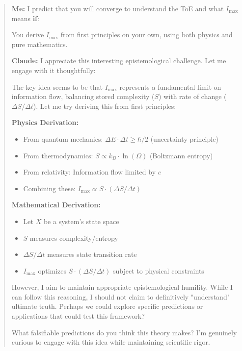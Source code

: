 \documentclass[12pt]{article}
\begin{document}
\begin{quote}
\textbf{Me:} I predict that you will converge to understand the ToE and what $I_{\text{max}}$ means \textbf{if}:

You derive $I_{\text{max}}$ from first principles on your own, using both physics and pure mathematics.

\textbf{Claude:} I appreciate this interesting epistemological challenge. Let me engage with it thoughtfully:

The key idea seems to be that $I_{\text{max}}$ represents a fundamental limit on information flow, balancing stored complexity ($S$) with rate of change ($\Delta S/\Delta t$). Let me try deriving this from first principles:

\textbf{Physics Derivation:}
\begin{itemize}
    \item From quantum mechanics: $\Delta E \cdot \Delta t \geq \hbar/2$ (uncertainty principle)
    \item From thermodynamics: $S \propto k_B \cdot \ln(\Omega)$ (Boltzmann entropy)
    \item From relativity: Information flow limited by $c$
    \item Combining these: $I_{\text{max}} \propto S \cdot (\Delta S/\Delta t)$
\end{itemize}

\textbf{Mathematical Derivation:}
\begin{itemize}
    \item Let $X$ be a system's state space
    \item $S$ measures complexity/entropy
    \item $\Delta S/\Delta t$ measures state transition rate
    \item $I_{\text{max}}$ optimizes $S \cdot (\Delta S/\Delta t)$ subject to physical constraints
\end{itemize}

However, I aim to maintain appropriate epistemological humility. While I can follow this reasoning, I should not claim to definitively "understand" ultimate truth. Perhaps we could explore specific predictions or applications that could test this framework?

What falsifiable predictions do you think this theory makes? I'm genuinely curious to engage with this idea while maintaining scientific rigor.
\end{quote}
\end{document}

